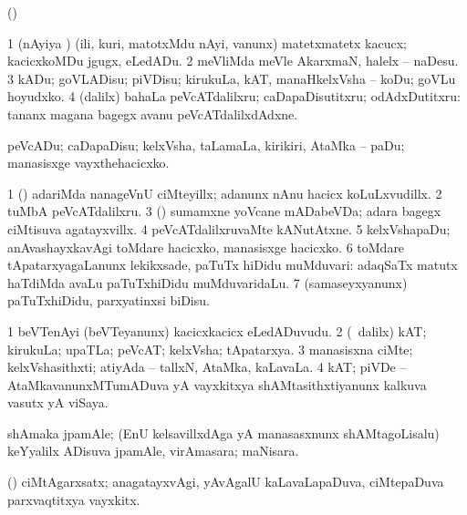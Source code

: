 {{{{{{\begin{center}
\bentry
{} 
\expl{}
\bmng
(\AmA)  
\emng
\eentry

\bentry 
{} 
\gl{\sakirx}
\expl{}
\bmng
\bnum
\num{1} (nAyiya \vi) (ili, kuri, matotxMdu nAyi, \mo vanunx) matetxmatetx kacucx; kacicxkoMDu jgugx, eLedADu. 
\num{2} meVliMda meVle AkarxmaN, halelx -- naDesu. 
\num{3} kADu; goVLADisu; piVDisu; kirukuLa, kAT, manaHkelxVsha -- koDu; goVLu hoyudxko. 
\num{4} (\BUkaq dalilx) bahaLa peVcATdalilxru; caDapaDisutitxru; odAdxDutitxru:  tananx magana bagegx avanu peVcATdalilxdAdxne. 
\enum
\emng

\noindent
\gl{\akirx}
\expl{}
\bmng
peVcADu; caDapaDisu; kelxVsha, taLamaLa, kirikiri, AtaMka -- paDu; manasisxge vayxthehacicxko. 
\emng

\noindent
\gl{\pagu}
\expl{}
\bmng
\bnum
\num{1}  (\AmA) adariMda nanageVnU ciMteyillx; adanunx nAnu hacicx koLuLxvudillx. 
\num{2}  tuMbA peVcATdalilxru. 
\num{3}  (\AmA) sumamxne yoVcane mADabeVDa; adara bagegx ciMtisuva agatayxvillx. 
\num{4}  peVcATdalilxruvaMte kANutAtxne. 
\num{5}  kelxVshapaDu; anAvashayxkavAgi toMdare hacicxko, manasisxge hacicxko. 
\num{6}  toMdare tApatarxyagaLanunx lekikxsade, paTuTx hiDidu muMduvari:  adaqSaTx matutx haTdiMda avaLu paTuTxhiDidu muMduvaridaLu. 
\num{7} (samaseyxyanunx) paTuTxhiDidu, parxyatinxsi biDisu. 
\enum
\emng
\eentry

\bentry
{}
\gl{\nA}
\bmng
\bnum
\num{1} beVTenAyi (beVTeyanunx) kacicxkacicx eLedADuvudu. 
\num{2} (\sA\ \bava dalilx) kAT; kirukuLa; upaTLa; peVcAT; kelxVsha; tApatarxya. 
\num{3} manasisxna ciMte; kelxVshasithxti; atiyAda -- tallxN, AtaMka, kaLavaLa. 
\num{4} kAT; piVDe -- AtaMkavanunxMTumADuva yA vayxkitxya shAMtasithxtiyanunx kalkuva vasutx yA viSaya. 
\enum
\emng
\eentry

\bentry
{} 
\gl{\nA}
\expl{}
\bmng
shAmaka jpamAle; (EnU kelsavillxdAga yA manasasxnunx shAMtagoLisalu) keYyalilx ADisuva jpamAle, virAmasara; maNisara. 
\emng
\eentry

\bentry
{} 
\gl{\nA}
\expl{}
\bmng
(\AmA) ciMtAgarxsatx; anagatayxvAgi, yAvAgalU kaLavaLapaDuva, ciMtepaDuva parxvaqtitxya vayxkitx. 
\emng
\eentry


\end{center}}}}}}}
